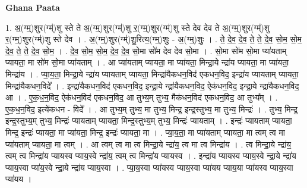 \documentclass[17pt]{extarticle}
\begin{document}
\textbf{Ghana Paata } \newline

1. अ॒(ग्म्॒)शुर(ग्म्॑)शु स्ते ते अ॒(ग्म्॒)शुर(ग्म्॑)शु र॒(ग्म्॒)शुर(ग्म्॑)शु स्ते देव देव ते अ॒(ग्म्॒)शुर(ग्म्॑)शु र॒(ग्म्॒)शुर(ग्म्॑)शु स्ते देव । . अ॒(ग्म्॒)शुर(ग्म्॑)शु॒रित्य॒(ग्म्॒)शुः - अ॒(ग्म्॒)शुः॒ । . ते॒ दे॒व॒ दे॒व॒ ते॒ ते॒ दे॒व॒ सो॒म॒ सो॒म॒ दे॒व॒ ते॒ ते॒ दे॒व॒ सो॒म॒ । . दे॒व॒ सो॒म॒ सो॒म॒ दे॒व॒ दे॒व॒ सो॒मा सो॑म देव देव सो॒मा । . सो॒मा सो॑म सो॒मा प्या॑यताम् प्यायता॒ मा सो॑म सो॒मा प्या॑यताम् । . आ प्या॑यताम् प्यायता॒ मा प्या॑यता॒ मिन्द्रा॒ये न्द्रा॑य प्यायता॒ मा प्या॑यता॒ मिन्द्रा॑य । . प्या॒य॒ता॒ मिन्द्रा॒ये न्द्रा॑य प्यायताम् प्यायता॒ मिन्द्रा॑यैकधन॒विद॑ एकधन॒विद॒ इन्द्रा॑य प्यायताम् प्यायता॒ मिन्द्रा॑यैकधन॒विदे᳚ । . इन्द्रा॑यैकधन॒विद॑ एकधन॒विद॒ इन्द्रा॒ये न्द्रा॑यैकधन॒विद॒ ऐक॑धन॒विद॒ इन्द्रा॒ये न्द्रा॑यैकधन॒विद॒ आ । . ए॒क॒ध॒न॒विद॒ ऐक॑धन॒विद॑ एकधन॒विद॒ आ तुभ्य॒म् तुभ्य॒ मैक॑धन॒विद॑ एकधन॒विद॒ आ तुभ्य᳚म् । . ए॒क॒ध॒न॒विद॒ इत्ये॑कधन - विदे᳚ । . आ तुभ्य॒म् तुभ्य॒ मा तुभ्य॒ मिन्द्र॒ इन्द्र॒स्तुभ्य॒ मा तुभ्य॒ मिन्द्रः॑ । . तुभ्य॒ मिन्द्र॒ इन्द्र॒स्तुभ्य॒म् तुभ्य॒ मिन्द्रः॑ प्यायताम् प्यायता॒ मिन्द्र॒स्तुभ्य॒म् तुभ्य॒ मिन्द्रः॑ प्यायताम् । . इन्द्रः॑ प्यायताम् प्यायता॒ मिन्द्र॒ इन्द्रः॑ प्यायता॒ मा प्या॑यता॒ मिन्द्र॒ इन्द्रः॑ प्यायता॒ मा । . प्या॒य॒ता॒ मा प्या॑यताम् प्यायता॒ मा त्वम् त्व मा प्या॑यताम् प्यायता॒ मा त्वम् । . आ त्वम् त्व मा त्व मिन्द्रा॒ये न्द्रा॑य॒ त्व मा त्व मिन्द्रा॑य । . त्व मिन्द्रा॒ये न्द्रा॑य॒ त्वम् त्व मिन्द्रा॑य प्यायस्व प्याय॒स्वे न्द्रा॑य॒ त्वम् त्व मिन्द्रा॑य प्यायस्व । . इन्द्रा॑य प्यायस्व प्याय॒स्वे न्द्रा॒ये न्द्रा॑य प्याय॒स्वा प्या॑य॒स्वे न्द्रा॒ये न्द्रा॑य प्याय॒स्वा । . प्या॒य॒स्वा प्या॑यस्व प्याय॒स्वा प्या॑यय प्याय॒या प्या॑यस्व प्याय॒स्वा प्या॑यय । \newline
\end{document}
